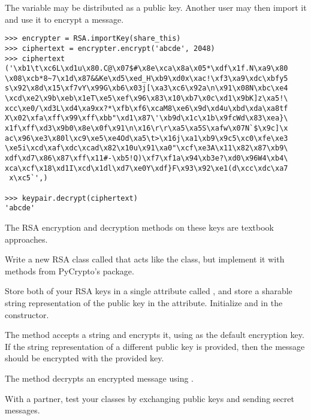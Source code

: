 The  variable may be distributed as a public key.
Another user may then import it and use it to encrypt a message.

\begin{lstlisting}
>>> encrypter = RSA.importKey(share_this)
>>> ciphertext = encrypter.encrypt('abcde', 2048)
>>> ciphertext
('\xb1\t\xc6L\xd1u\x80.C@\x07$#\x8e\xca\x8a\x05*\xdf\x1f.N\xa9\x80
\x08\xcb*8~7\x1d\x87&&Ke\xd5\xed_H\xb9\xd0x\xac!\xf3\xa9\xdc\xbfy5
s\x92\x8d\x15\xf7vY\x99G\xb6\x03j[\xa3\xc6\x92a\n\x91\x08N\xbc\xe4
\xcd\xe2\x9b\xeb\x1eT\xe5\xef\x96\x83\x10\xb7\x0c\xd1\x9bK]z\xa5!\
xcc\xe0/\xd3L\xd4\xa9xx?*\xfb\xf6\xcaM8\xe6\x9d\xd4u\xbd\xda\xa8tf
X\x02\xfa\xff\x99\xff\xbb"\xd1\x87\'\xb9d\x1c\x1b\x9fcWd\x83\xea}\
x1f\xff\xd3\x9b0\x8e\x0f\x91\n\x16\r\r\xa5\xa5S\xafw\x07N`$\x9c]\x
ac\x96\xe3\x80l\xc9\xe5\xe4Od\xa5\t>\x16j\xa1\xb9\x9c5\xc0\xfe\xe3
\xe5i\xcd\xaf\xdc\xcad\x82\x10u\x91\xa0"\xcf\xe3A\x11\x82\x87\xb9\
xdf\xd7\x86\x87\xff\x11#-\xb5!Q)\xf7\xf1a\x94\xb3e?\xd0\x96W4\xb4\
xca\xcf\x18\xd1I\xcd\x1dl\xd7\xe0Y\xdf}F\x93\x92\xe1(d\xcc\xdc\xa7
 x\xc5`',)

>>> keypair.decrypt(ciphertext)
'abcde'
\end{lstlisting}

The RSA encryption and decryption methods on these keys are textbook approaches.

\begin{comment}
However, to increase security, we will want to pad the messages so every message encrypted with a particular key will become exactly as large (in bits) as the key itself.
A commonly used padding algorithm is implemented in PyCrypto in the \li{Crypto.Cipher.PKCS1_OAEP} module.
\begin{lstlisting}
>>> from Crypto.Cipher import PKCS1_OAEP as oaep

# generate a new key from the original RSA key.
# This key can encrypt and decrypt
>>> paddedkey = oaep.new(keypair)
>>> encrypted = paddedkey.encrypt('hello world')
>>> paddedkey.decrypt(encrypted)
'hello world'
\end{lstlisting}
\end{comment}

\begin{problem}
Write a new RSA class called  that acts like the  class, but implement it with methods from PyCrypto's  package.

Store both of your RSA keys in a single attribute called , and store a sharable string representation of the public key in the  attribute.
Initialize  and  in the constructor.

The  method accepts a string and encrypts it, using  as the default encryption key.
If the string representation of a different public key is provided, then the message should be encrypted with the provided key.

The  method decrypts an encrypted message using .

With a partner, test your classes by exchanging public keys and sending secret messages.
\end{problem}

